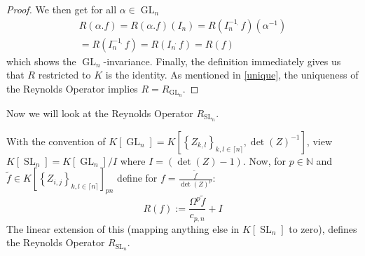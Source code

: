 \begin{proof}
  We then get for all $ \alpha \in \operatorname{GL}_n $
  \begin{equation}
    \begin{aligned}
      R \left( \alpha . f \right)
      = R \left( \alpha . f \right) \left( I_n \right)
      = R \left( I_n^{-1} \dot{\phantom{.}} f \right) \left( \alpha^{-1} \right) \\
      = R \left( I_n^{-1} \dot{\phantom{.}} f \right)
      = R \left( I_n \dot{\phantom{.}} f \right) 
      = R (f)
  \end{aligned}
  \end{equation}
  which shows the $\operatorname{GL}_n$-invariance.
  Finally, the definition immediately gives us that $R$ restricted to $K$ is the identity.  As mentioned in \ref{unique}, the uniqueness of the Reynolds Operator implies $ R = R_{\operatorname{GL}_n} $.
\end{proof}

Now we will look at the Reynolds Operator $R_{\operatorname{SL}_n}$.

\begin{corollary}
  With the convention of $ K \left\lbrack \operatorname{GL}_n \right\rbrack = K \left\lbrack \left\{ Z_{k,l} \right\}_{k,l \in \lceil n \rceil} , \operatorname{det} (Z) ^{-1} \right\rbrack $, view $ K \left\lbrack \operatorname{SL}_n \right\rbrack = K \left\lbrack \operatorname{GL}_n \right\rbrack / I $ where $ I = \left( \operatorname{det} (Z) -1 \right) $.
  Now, for $ p \in \mathbb{N} $ and $ \tilde{f} \in K \left\lbrack \left\{ Z_{i,j} \right\}_{k,l \in \lceil n \rceil} \right\rbrack_{pn} $ define for $ f = \frac{\tilde{f}}{\operatorname{det}(Z)^p} $:
  \begin{equation}
    R \left( f \right) := \frac{\Omega^p \tilde{f}}{c_{p,n}} + I
  \end{equation}
  The linear extension of this (mapping anything else in $K \left\lbrack \operatorname{SL}_n \right\rbrack$ to zero), defines the Reynolds Operator $R_{\operatorname{SL}_n}$.
\end{corollary}

